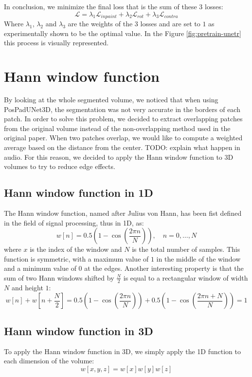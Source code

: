 In conclusion, we minimize the final loss that is the sum of these 3 losses:
$$
\mathcal{L} = \lambda_1\mathcal{L}_{inpaint} + \lambda_2\mathcal{L}_{rot} +
\lambda_3\mathcal{L}_{contra}
$$
Where $\lambda_1$, $\lambda_2$ and $\lambda_3$ are the weights of the 3 losses
and are set to $1$ as experimentally shown to be the optimal value. In the
Figure \ref{fig:pretrain-unetr} this process is visually represented.

\section{Hann window function}
By looking at the whole segmented volume, we noticed that when using
PosPadUNet3D, the segmentation was not very accurate in the borders of each
patch. In order to solve this problem, we decided to extract overlapping patches
from the original volume instead of the non-overlapping method used in the
original paper. When two patches overlap, we would like to compute a weighted
average based on the distance from the center.
TODO: explain what happen in audio.
For this reason, we decided to apply the Hann window function to 3D volumes to
try to reduce edge effects.
\subsection{Hann window function in 1D}
The Hann window function, named after Julius von Hann, has been fist defined in
the field of signal processing, thus in 1D, as:
$$
w[n] = 0.5(1 - \cos(\frac{2\pi n}{N})), \quad n = 0, \dots, N
$$
where $x$ is the index of the window and $N$ is the total number of samples.
This function is symmetric, with a maximum value of $1$ in the middle of the
window and a minimum value of $0$ at the edges.
Another interesting property is that the sum of two Hann windows shifted by $\frac{N}{2}$
is equal to a rectangular window of width $N$ and height $1$:
$$
w[n] + w[n + \frac{N}{2}] = 0.5(1 - \cos(\frac{2\pi n}{N})) + 0.5(1 - \cos(\frac{2\pi n + N}{N} )) = 1
$$
\subsection{Hann window function in 3D}
To apply the Hann window function in 3D, we simply apply the 1D function to each
dimension of the volume:
$$
  w[x, y, z] = w[x]w[y]w[z]
$$

